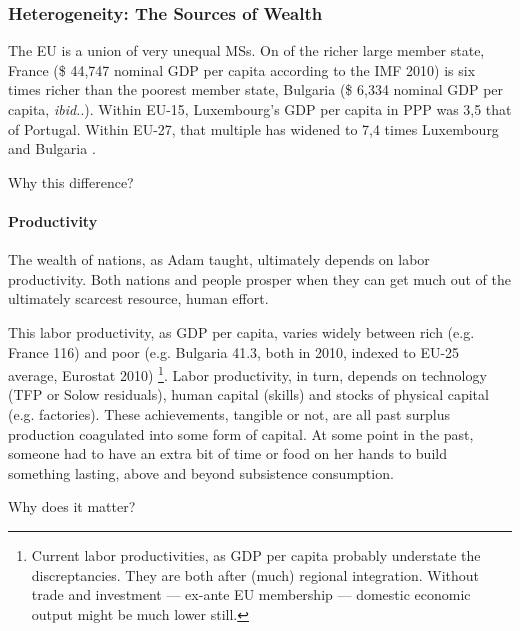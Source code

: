 \documentclass[11pt,a4paper,oneside]{article}
\begin{document}
\subsubsection[Heterogeneity]{Heterogeneity: The Sources of Wealth} \label{sec:sources-of-wealth} The \gls{EU} is a union of very unequal \glspl{MS}.
On of the richer large member state, France (\$ 44,747 nominal \gls{GDP} per capita according to the IMF 2010) is six times richer than the poorest member state, Bulgaria (\$ 6,334 nominal \gls{GDP} per capita, \emph{ibid.}.).
Within \gls{EU}-15, Luxembourg's \gls{GDP} per capita in \gls{PPP} was 3,5 that of Portugal.
Within \gls{EU}-27, that multiple has widened to 7,4 times Luxembourg and Bulgaria \citep[1]{Alber2008}. %

Why this difference?

\paragraph{Productivity} The wealth of nations, as Adam \cite{Smith-1776-lq} taught, ultimately depends on labor productivity.
Both nations and people prosper when they can get much out of the ultimately scarcest resource, human effort.

This labor productivity, as \gls{GDP} per capita, varies widely between rich (e.g. France 116) and poor (e.g. Bulgaria 41.3, both in 2010, indexed to EU-25 average, Eurostat 2010)
\footnote{
	Current labor productivities, as \gls{GDP} per capita probably understate the discreptancies.
	They are both after (much) regional integration.
	Without trade and investment --- ex-ante EU membership --- domestic economic output might be much lower still.
}.
Labor productivity, in turn, depends on technology (\gls{TFP} or Solow residuals), human capital (skills) and stocks of physical capital (e.g. factories).
These achievements, tangible or not, are all past surplus production coagulated into some form of capital.
At some point in the past, someone had to have an extra bit of time or food on her hands to build something lasting, above and beyond subsistence consumption.

Why does it matter?
\end{document}
